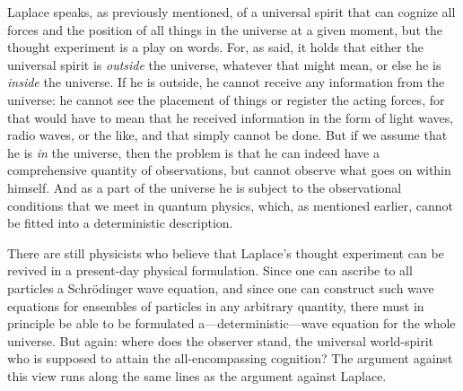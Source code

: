 \documentclass[12pt,a4paper]{book}
\begin{document}
Laplace speaks, as previously mentioned, of a universal spirit that can cognize all forces and the position of all things in the universe at a given moment, but the thought experiment is a play on words. For, as said, it holds that either the universal spirit is \emph{outside} the universe, whatever that might mean, or else he is \emph{inside} the universe. If he is outside, he cannot receive any information from the universe: he cannot see the placement of things or register the acting forces, for that would have to mean that he received information in the form of light waves, radio waves, or the like, and that simply cannot be done. But if we assume that he is \emph{in} the universe, then the problem is that he can indeed have a comprehensive quantity of observations, but cannot observe what goes on within himself. And as a part of the universe he is subject to the observational conditions that we meet in quantum physics, which, as mentioned earlier, cannot be fitted into a deterministic description.

There are still physicists who believe that Laplace's thought experiment can be revived in a present-day physical formulation. Since one can ascribe to all particles a Schrödinger wave equation, and since one can construct such wave equations for ensembles of particles in any arbitrary quantity, there must in principle be able to be formulated a---deterministic---wave equation for the whole universe. But again: where does the observer stand, the universal world-spirit who is supposed to attain the all-encompassing cognition? The argument against this view runs along the same lines as the argument against Laplace.
\end{document}
